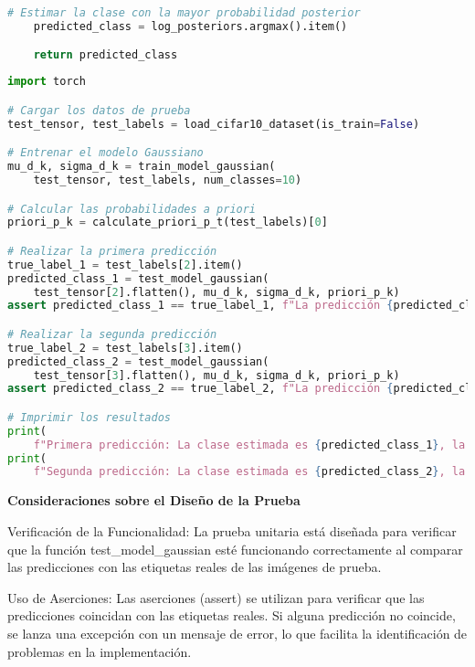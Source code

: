 \documentclass[spanish]{article}
\begin{document}
\begin{enumerate}
\begin{enumerate}
\begin{enumerate}
\begin{lstlisting}[language=Python, caption=Implementacion Test Model Gaussian]
    # Estimar la clase con la mayor probabilidad posterior
    predicted_class = log_posteriors.argmax().item()

    return predicted_class
\end{lstlisting}

\begin{lstlisting}[language=Python, caption=Salida Prueba Modelo]
import torch

# Cargar los datos de prueba
test_tensor, test_labels = load_cifar10_dataset(is_train=False)

# Entrenar el modelo Gaussiano
mu_d_k, sigma_d_k = train_model_gaussian(
    test_tensor, test_labels, num_classes=10)

# Calcular las probabilidades a priori
priori_p_k = calculate_priori_p_t(test_labels)[0]

# Realizar la primera predicción
true_label_1 = test_labels[2].item()
predicted_class_1 = test_model_gaussian(
    test_tensor[2].flatten(), mu_d_k, sigma_d_k, priori_p_k)
assert predicted_class_1 == true_label_1, f"La predicción {predicted_class_1} no coincide con la etiqueta real {true_label_1}"

# Realizar la segunda predicción
true_label_2 = test_labels[3].item()
predicted_class_2 = test_model_gaussian(
    test_tensor[3].flatten(), mu_d_k, sigma_d_k, priori_p_k)
assert predicted_class_2 == true_label_2, f"La predicción {predicted_class_2} no coincide con la etiqueta real {true_label_2}"

# Imprimir los resultados
print(
    f"Primera predicción: La clase estimada es {predicted_class_1}, la clase real es {true_label_1}")
print(
    f"Segunda predicción: La clase estimada es {predicted_class_2}, la clase real es {true_label_2}")
\end{lstlisting}

\par \textbf{Consideraciones sobre el Diseño de la Prueba}
\par Verificación de la Funcionalidad: La prueba unitaria está diseñada para verificar que la función test\_model\_gaussian esté funcionando correctamente al comparar las predicciones con las etiquetas reales de las imágenes de prueba.
\vspace{5px}

\par Uso de Aserciones: Las aserciones (assert) se utilizan para verificar que las predicciones coincidan con las etiquetas reales. Si alguna predicción no coincide, se lanza una excepción con un mensaje de error, lo que facilita la identificación de problemas en la implementación.
\vspace{5px}


\end{enumerate}
\end{enumerate}
\end{enumerate}
\end{document}
